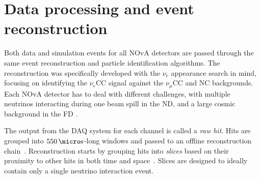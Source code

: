 
\section{Data processing and event reconstruction}\label{sec:NOvAReconstruction}
Both data and simulation events for all \gls{NOvA} detectors are passed through the same event reconstruction and particle identification algorithms. The reconstruction was specifically developed with the $\nu_e$ appearance search in mind, focusing on identifying the $\nu_e$\gls{CC} signal against the $\nu_\mu$\gls{CC} and \gls{NC} backgrounds. Each \gls{NOvA} detector has to deal with different challenges, with multiple neutrinos interacting during one beam spill in the \gls{ND}, and a large cosmic background in the \gls{FD} \cite{NOvAReco.pdf}.

The output from the \gls{DAQ} system for each channel is called a \textit{raw hit}. Hits are grouped into $\unit[550]{\micro s}$-long windows and passed to an offline reconstruction chain~\cite{NOvAReco.pdf}. Reconstruction starts by grouping hits into \textit{slices} based on their proximity to other hits in both time and space~\cite{DBSCAN.pdf}. Slices are designed to ideally contain only a single neutrino interaction event.

